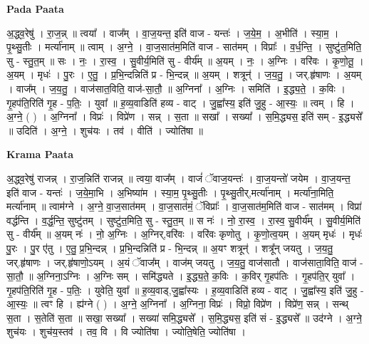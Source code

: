 \documentclass[17pt]{extarticle}
\begin{document}
\textbf{Pada Paata} \newline

अ॒द्ध्व॒रेषु॑ । रा॒ज॒न्न् ॥ त्वया᳚ । वाज᳚म् । वा॒ज॒यन्त॒ इति॑ वाज - यन्तः॑ । ज॒ये॒म॒ । अ॒भीति॑ । स्या॒म॒ । पृ॒थ्सु॒तीः । मर्त्या॑नाम् ॥ त्वाम् । अ॒ग्ने॒ । वा॒ज॒सात॑म॒मिति॑ वाज - सात॑मम् । विप्राः᳚ । व॒र्ध॒न्ति॒ । सुष्टु॑त॒मिति॒ सु - स्तु॒त॒म् ॥ सः । नः॒ । रा॒स्व॒ । सु॒वीर्य॒मिति॑ सु - वीर्य᳚म् ॥ अ॒यम् । नः॒ । अ॒ग्निः । वरि॑वः । कृ॒णो॒तू॒ । अ॒यम् । मृधः॑ । पु॒रः । ए॒तु॒ । प्र॒भि॒न्दन्निति॑ प्र - भि॒न्दन्न् ॥ अ॒यम् । शत्रून्॑ । ज॒य॒तु॒ । जर्.हृ॑षाणः । अ॒यम् । वाज᳚म् । ज॒य॒तु॒ । वाज॑सात॒विति॒ वाज॑-सा॒तौ॒ ॥ अ॒ग्निना᳚ । अ॒ग्निः । समिति॑ । इ॒द्ध्य॒ते॒ । क॒विः । गृ॒हप॑ति॒रिति॑ गृ॒ह - प॒तिः॒ । युवा᳚ ॥ ह॒व्य॒वाडिति॑ हव्य - वाट् । जु॒ह्वा᳚स्य॒ इति॑ जु॒हु - आ॒स्यः॒ ॥ त्वम् । हि । अ॒ग्ने॒ ( ) । अ॒ग्निना᳚ । विप्रः॑ । विप्रे॑ण । सन्न् । स॒ता ॥ सखा᳚ । सख्या᳚ । स॒मि॒द्ध्यस॒ इति॑ सम् - इ॒द्ध्यसे᳚ ॥ उदिति॑ । अ॒ग्ने॒ । शुच॑यः । तव॑ । वीति॑ । ज्योति॑षा ॥  \newline


\textbf{Krama Paata} \newline

अ॒द्ध्व॒रेषु॑ राजन्न् । रा॒ज॒न्निति॑ राजन्न् ॥ त्वया॒ वाज᳚म् । वाजं॑ ॅवाज॒यन्तः॑ । वा॒ज॒यन्तो॑ जयेम । वा॒ज॒यन्त॒ इति॑ वाज - यन्तः॑ । ज॒ये॒मा॒भि । अ॒भिष्या॑म । स्या॒म॒ पृ॒थ्सु॒तीः । पृ॒थ्सु॒तीर्,मर्त्या॑नाम् । मर्त्या॑ना॒मिति॒ मर्त्या॑नाम् ॥ त्वाम॑ग्ने । अ॒ग्ने॒ वा॒ज॒सात॑मम् । वा॒ज॒सात॑मं॒ ॅविप्राः᳚ । वा॒ज॒सात॑म॒मिति॑ वाज - सात॑मम् । विप्रा॑ वर्द्धन्ति । व॒र्द्ध॒न्ति॒ सुष्टु॑तम् । सुष्टु॑त॒मिति॒ सु - स्तु॒त॒म् ॥ स नः॑ । नो॒ रा॒स्व॒ । रा॒स्व॒ सु॒वीर्य᳚म् । सु॒वीर्य॒मिति॑ सु - वीर्य᳚म् ॥ अ॒यम् नः॑ । नो॒ अ॒ग्निः । अ॒ग्निर्,वरि॑वः । वरि॑वः कृणोतु । कृ॒णो॒त्व॒यम् । अ॒यम् मृधः॑ । मृधः॑ पु॒रः । पु॒र ए॑तु । ए॒तु॒ प्र॒भि॒न्दन्न् । प्र॒भि॒न्दन्निति॑ प्र - भि॒न्दन्न् ॥ अ॒यꣳ शत्रून्॑ । शत्रू᳚न् जयतु । ज॒य॒तु॒ जर्.हृ॑षाणः । जर्.हृ॑षाणो॒ऽयम् । अ॒यं ॅवाज᳚म् । वाज॑म् जयतु । ज॒य॒तु॒ वाज॑सातौ । वाज॑साता॒विति॒ वाज॑ - सा॒तौ॒ ॥ अ॒ग्निना॒ऽग्निः । अ॒ग्निः सम् । समि॑द्ध्यते । इ॒द्ध्य॒ते॒ क॒विः । क॒विर् गृ॒हप॑तिः । गृ॒हप॑ति॒र् युवा᳚ । गृ॒हप॑ति॒रिति॑ गृ॒ह - प॒तिः॒ । युवेति॒ युवा᳚ ॥ ह॒व्य॒वाड्,जु॒ह्वा᳚स्यः । ह॒व्य॒वाडिति॑ हव्य - वाट् । जु॒ह्वा᳚स्य॒ इति॑ जु॒हु - आ॒स्यः॒ ॥ त्वꣳ हि । ह्य॑ग्ने ( ) । अ॒ग्ने॒ अ॒ग्निना᳚ । अ॒ग्निना॒ विप्रः॑ । विप्रो॒ विप्रे॑ण । विप्रे॑ण॒ सन्न् । सन्थ् स॒ता । स॒तेति॑ स॒ता ॥ सखा॒ सख्या᳚ । सख्या॑ समि॒द्ध्यसे᳚ । स॒मि॒द्ध्यस॒ इति॑ सं - इ॒द्ध्यसे᳚ ॥ उद॑ग्ने । अ॒ग्ने॒ शुच॑यः । शुच॑य॒स्तव॑ । तव॒ वि । वि ज्योति॑षा । ज्योति॒षेति॒ ज्योति॑षा । \newline
\end{document}
